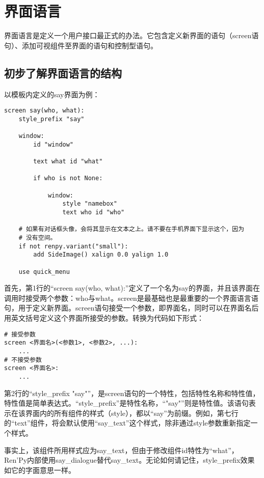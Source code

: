 \documentclass[../../Main.tex]{subfiles}
\begin{document}
\section{界面语言}
界面语言是定义一个用户接口最正式的办法。它包含定义新界面的语句（screen语句）、添加可视组件至界面的语句和控制型语句。

\subsection{初步了解界面语言的结构}

以模板内定义的say界面为例：
\begin{lstlisting}
screen say(who, what):
    style_prefix "say"

    window:
        id "window"

        text what id "what"

        if who is not None:

            window:
                style "namebox"
                text who id "who"

    # 如果有对话框头像，会将其显示在文本之上。请不要在手机界面下显示这个，因为
    # 没有空间。
    if not renpy.variant("small"):
        add SideImage() xalign 0.0 yalign 1.0

    use quick_menu
\end{lstlisting}

首先，第1行的“screen say(who, what):”定义了一个名为say的界面，并且该界面在调用时接受两个参数：who与what。screen是最基础也是最重要的一个界面语言语句，用于定义新界面。screen语句接受一个参数，即界面名，同时可以在界面名后用英文括号定义这个界面所接受的参数。转换为代码如下形式：
\begin{lstlisting}
# 接受参数
screen <界面名>(<参数1>, <参数2>, ...):
    ...
# 不接受参数
screen <界面名>:
    ...
\end{lstlisting}

第2行的“style\_prefix "say"”，是screen语句的一个特性，包括特性名称和特性值，特性值是简单表达式。“style\_prefix”是特性名称，“"say"”则是特性值。该语句表示在该界面内的所有组件的样式（style），都以“say”为前缀。例如，第七行的“text”组件，将会默认使用“say\_text”这个样式，除非通过style参数重新指定一个样式。

\begin{ExtraKnowledge}
    事实上，该组件所用样式应为say\_text，但由于修改组件id特性为“what”，Ren'Py内部使用say\_dialogue替代say\_text。无论如何请记住，style\_prefix效果如它的字面意思一样。
\end{ExtraKnowledge}
\end{document}

